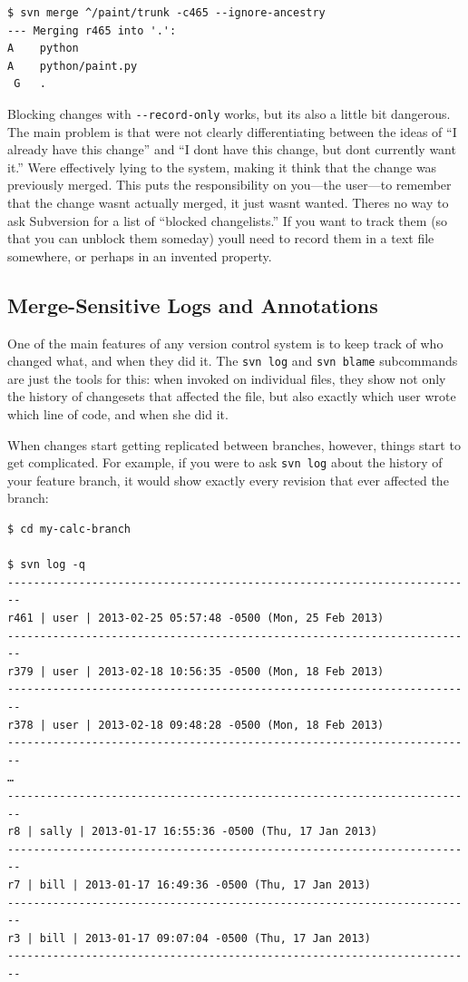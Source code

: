 \begin{verbatim}
$ svn merge ^/paint/trunk -c465 --ignore-ancestry
--- Merging r465 into '.':
A    python
A    python/paint.py
 G   .
\end{verbatim}

Blocking changes with \texttt{-\/-record-only} works, but
it\textquotesingle s also a little bit dangerous. The main problem is
that we\textquotesingle re not clearly differentiating between the ideas
of ``I already have this change'' and ``I don\textquotesingle t have
this change, but don\textquotesingle t currently want it.''
We\textquotesingle re effectively lying to the system, making it think
that the change was previously merged. This puts the responsibility on
you---the user---to remember that the change wasn\textquotesingle t
actually merged, it just wasn\textquotesingle t wanted.
There\textquotesingle s no way to ask Subversion for a list of ``blocked
changelists.'' If you want to track them (so that you can unblock them
someday) you\textquotesingle ll need to record them in a text file
somewhere, or perhaps in an invented property.

\subsection{Merge-Sensitive Logs and
Annotations}\label{svn.branchmerge.advanced.logblame}

One of the main features of any version control system is to keep track
of who changed what, and when they did it. The \texttt{svn\ log} and
\texttt{svn\ blame} subcommands are just the tools for this: when
invoked on individual files, they show not only the history of
changesets that affected the file, but also exactly which user wrote
which line of code, and when she did it.

When changes start getting replicated between branches, however, things
start to get complicated. For example, if you were to ask
\texttt{svn\ log} about the history of your feature branch, it would
show exactly every revision that ever affected the branch:

\begin{verbatim}
$ cd my-calc-branch

$ svn log -q
------------------------------------------------------------------------
r461 | user | 2013-02-25 05:57:48 -0500 (Mon, 25 Feb 2013)
------------------------------------------------------------------------
r379 | user | 2013-02-18 10:56:35 -0500 (Mon, 18 Feb 2013)
------------------------------------------------------------------------
r378 | user | 2013-02-18 09:48:28 -0500 (Mon, 18 Feb 2013)
------------------------------------------------------------------------
…
------------------------------------------------------------------------
r8 | sally | 2013-01-17 16:55:36 -0500 (Thu, 17 Jan 2013)
------------------------------------------------------------------------
r7 | bill | 2013-01-17 16:49:36 -0500 (Thu, 17 Jan 2013)
------------------------------------------------------------------------
r3 | bill | 2013-01-17 09:07:04 -0500 (Thu, 17 Jan 2013)
------------------------------------------------------------------------
\end{verbatim}

